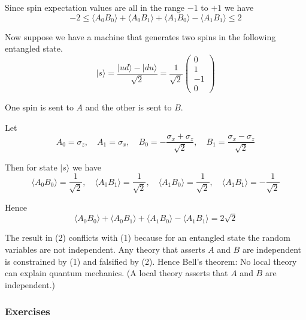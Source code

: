 Since spin expectation values are all in the range $-1$ to $+1$ we have
\begin{equation*}
-2\le \langle A_0B_0\rangle+\langle A_0B_1\rangle+\langle A_1B_0\rangle-\langle A_1B_1\rangle\le2
\tag{1}
\end{equation*}

Now suppose we have a machine that generates two spins in the following entangled state.
\begin{equation*}
|s\rangle
=\frac{|ud\rangle-|du\rangle}{\sqrt2}
=\frac{1}{\sqrt2}\begin{pmatrix}0\\1\\-1\\0\end{pmatrix}
\end{equation*}

One spin is sent to $A$ and the other is sent to $B$.

\bigskip
Let
\begin{equation*}
A_0=\sigma_z,\quad
A_1=\sigma_x,\quad
B_0=-\frac{\sigma_x+\sigma_z}{\sqrt2},\quad
B_1=\frac{\sigma_x-\sigma_z}{\sqrt2}
\end{equation*}

Then for state $|s\rangle$ we have
\begin{equation*}
\langle A_0B_0\rangle=\frac{1}{\sqrt2},\quad
\langle A_0B_1\rangle=\frac{1}{\sqrt2},\quad
\langle A_1B_0\rangle=\frac{1}{\sqrt2},\quad
\langle A_1B_1\rangle=-\frac{1}{\sqrt2}
\end{equation*}

Hence
\begin{equation*}
\langle A_0B_0\rangle+
\langle A_0B_1\rangle+
\langle A_1B_0\rangle-
\langle A_1B_1\rangle=2\sqrt2
\tag{2}
\end{equation*}

The result in (2) conflicts with (1) because for an entangled state
the random variables are not independent.
Any theory that asserts $A$ and $B$ are independent
is constrained by (1) and falsified by (2).
Hence Bell's theorem: No local theory can explain quantum mechanics.
(A local theory asserts that $A$ and $B$ are independent.)

\subsubsection*{Exercises}

